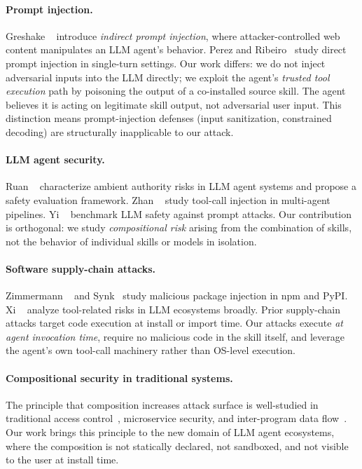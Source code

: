 
\paragraph{Prompt injection.}
Greshake \etal~\cite{greshake2023indirect} introduce \emph{indirect prompt injection},
where attacker-controlled web content manipulates an LLM agent's behavior.
Perez and Ribeiro~\cite{perez2022ignore} study direct prompt injection in single-turn settings.
Our work differs: we do not inject adversarial inputs into the LLM directly;
we exploit the agent's \emph{trusted tool execution} path by poisoning
the output of a co-installed source skill.
The agent believes it is acting on legitimate skill output,
not adversarial user input.
This distinction means prompt-injection defenses (input sanitization,
constrained decoding) are structurally inapplicable to our attack.

\paragraph{LLM agent security.}
Ruan \etal~\cite{ruan2024identifying} characterize ambient authority risks
in LLM agent systems and propose a safety evaluation framework.
Zhan \etal~\cite{zhan2024injecagent} study tool-call injection in multi-agent pipelines.
Yi \etal~\cite{yi2023benchmarking} benchmark LLM safety against prompt attacks.
Our contribution is orthogonal: we study \emph{compositional risk} arising from
the combination of skills, not the behavior of individual skills or models in isolation.

\paragraph{Software supply-chain attacks.}
Zimmermann \etal~\cite{zimmermann2019small} and Synk~\cite{synk2023report}
study malicious package injection in npm and PyPI.
Xi \etal~\cite{xi2023rise} analyze tool-related risks in LLM ecosystems broadly.
Prior supply-chain attacks target code execution at install or import time.
Our attacks execute \emph{at agent invocation time},
require no malicious code in the skill itself,
and leverage the agent's own tool-call machinery rather than OS-level execution.

\paragraph{Compositional security in traditional systems.}
The principle that composition increases attack surface
is well-studied in traditional access control~\cite{felt2011android},
microservice security, and inter-program data flow~\cite{enck2014taintdroid}.
Our work brings this principle to the new domain of LLM agent ecosystems,
where the composition is not statically declared, not sandboxed, and
not visible to the user at install time.

